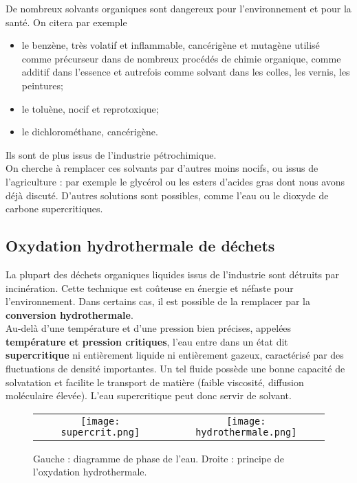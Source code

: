 \documentclass[11pt,a4paper]{report}
\begin{document}
De nombreux solvants organiques sont dangereux pour l'environnement et pour la santé. On citera par exemple
\begin{itemize}
	\item le benzène, très volatif et inflammable, cancérigène et mutagène utilisé comme précurseur 		dans de nombreux procédés de chimie organique, comme additif dans l'essence et autrefois comme 			solvant dans les colles, les vernis, les peintures;
	\item le toluène, nocif et reprotoxique;
	\item le dichlorométhane, cancérigène.
\end{itemize}
Ils sont de plus issus de l'industrie pétrochimique.\\

On cherche à remplacer ces solvants par d'autres moins nocifs, ou issus de l'agriculture : par exemple le glycérol ou les esters d'acides gras dont nous avons déjà discuté. D'autres solutions sont possibles, comme l'eau ou le dioxyde de carbone supercritiques.

\newpage
\subsection{Oxydation hydrothermale de déchets}

La plupart des déchets organiques liquides issus de l'industrie sont détruits par incinération. Cette technique est coûteuse en énergie et néfaste pour l'environnement. Dans certains cas, il est possible de la remplacer par la \textbf{conversion hydrothermale}.\\

Au-delà d'une température et d'une pression bien précises, appelées \textbf{température et pression critiques}, l'eau entre dans un état dit \textbf{supercritique} ni entièrement liquide ni entièrement gazeux, caractérisé par des fluctuations de densité importantes. Un tel fluide possède une bonne capacité de solvatation et facilite le transport de matière (faible viscosité, diffusion moléculaire élevée). L'eau supercritique peut donc servir de solvant.
	
\begin{figure}[h!]
	\begin{center}
	\begin{tabular}{cc}
		\texttt{[image: supercrit.png]}&
		\texttt{[image: hydrothermale.png]}\\
	\end{tabular}
	\end{center}	
	\caption{Gauche : diagramme de phase de l'eau. Droite : principe de l'oxydation hydrothermale.}
\end{figure}
	
\end{document}
